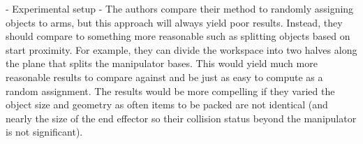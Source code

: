 \documentclass[journal]{IEEEtran}
\begin{document}
	\begin{partt}
		
		- Experimental setup - The authors compare their method to randomly assigning objects to arms, but this approach will always yield poor results.  Instead, they should compare to something more reasonable such as splitting objects based on start proximity.  For example, they can divide the workspace into two halves along the plane that splits the manipulator bases.  This would yield much more reasonable results to compare against and be just as easy to compute as a random assignment.  The results would be more compelling if they varied the object size and geometry as often items to be packed are not identical (and nearly the size of the end effector so their collision status beyond the manipulator is not significant).
		
	\end{partt}
	
\end{document}

